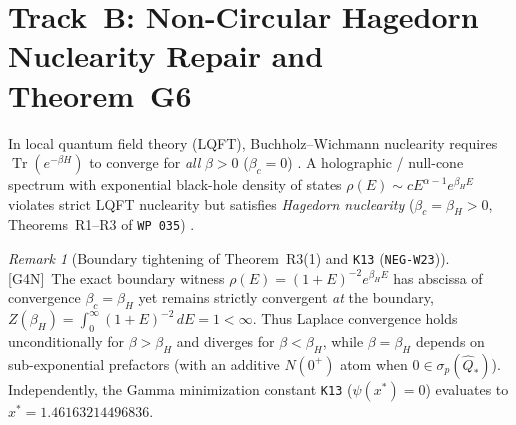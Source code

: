 \documentclass[11pt]{amsart}
\numberwithin{equation}{section}
\theoremstyle{plain}
\theoremstyle{definition}\newtheorem{definition}[theorem]{Definition}
\theoremstyle{remark}\newtheorem{remark}[theorem]{Remark}
\newcommand{\ctag}[1]{\textup{\textsf{\scriptsize[#1]}}}
\begin{document}
\section{Track~B: Non-Circular Hagedorn Nuclearity Repair and Theorem~G6}
In local quantum field theory (LQFT), Buchholz--Wichmann nuclearity requires $\operatorname{Tr}(e^{-\beta H})$ to converge for \emph{all} $\beta > 0$ ($\beta_c = 0$) \cite{buchholz1986}. A holographic / null-cone spectrum with exponential black-hole density of states $\rho(E) \sim c E^{\alpha-1} e^{\beta_H E}$ violates strict LQFT nuclearity but satisfies \emph{Hagedorn nuclearity} ($\beta_c = \beta_H > 0$, Theorems~R1--R3 of \texttt{WP~035}) \cite{hagedorn1965,atick1988}.

\begin{remark}[Boundary tightening of Theorem~R3(1) and \texttt{K13} (\texttt{NEG-W23})]
\ctag{G4N}\ The exact boundary witness $\rho(E) = (1 + E)^{-2} e^{\beta_H E}$ has abscissa of convergence $\beta_c = \beta_H$ yet remains strictly convergent \emph{at} the boundary, $Z(\beta_H) = \int_0^\infty (1+E)^{-2}\,dE = 1 < \infty$. Thus Laplace convergence holds unconditionally for $\beta > \beta_H$ and diverges for $\beta < \beta_H$, while $\beta = \beta_H$ depends on sub-exponential prefactors (with an additive $N(0^+)$ atom when $0 \in \sigma_p(\hat{Q}_*)$). Independently, the Gamma minimization constant \texttt{K13} ($\psi(x^*) = 0$) evaluates to $x^* = 1.46163214496836$.
\end{remark}
\end{document}
